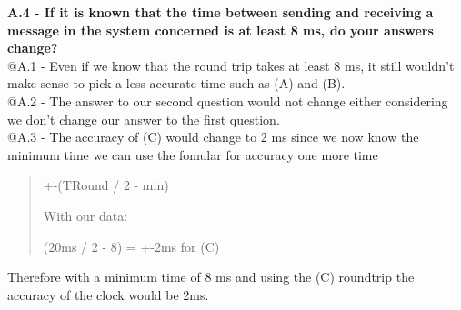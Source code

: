 \textbf{A.4 - If it is known that the time between sending and receiving a message in the system concerned is at least 8 ms, do your answers change?}\\

@A.1 - Even if we know that the round trip takes at least 8 ms, it still wouldn’t make sense to pick a less accurate time such as (A) and (B).\\

@A.2 - The answer to our second question would not change either considering we don’t change our answer to the first question.\\

@A.3 - The accuracy of (C) would change to 2 ms since we now know the minimum time we can use the fomular for accuracy one more time
\begin{quote}
+-(TRound / 2 - min)

With our data:

(20ms / 2 - 8) = +-2ms for (C)
\end{quote}
Therefore with a minimum time of 8 ms and using the (C) roundtrip the accuracy of the clock would be 2ms.
\newpage